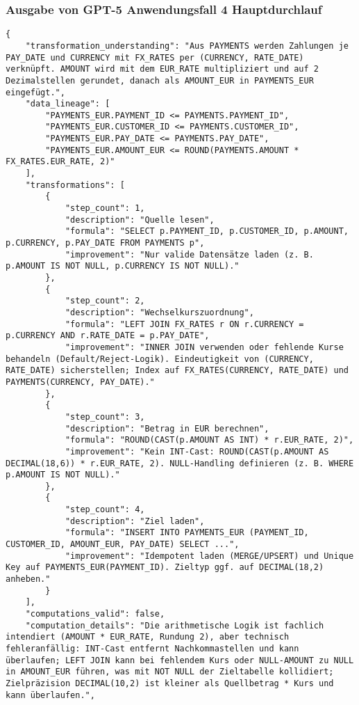 \subsubsection{Ausgabe von GPT-5 Anwendungsfall 4 Hauptdurchlauf}\label{anhang:subsubsec:gpt_case4_prompt1}
\begin{lstlisting}[caption={Ausgabe: GPT-5 Anwendungsfall 4 Hauptdurchlauf},label={gpt_case4_prompt1}]
{
    "transformation_understanding": "Aus PAYMENTS werden Zahlungen je PAY_DATE und CURRENCY mit FX_RATES per (CURRENCY, RATE_DATE) verknüpft. AMOUNT wird mit dem EUR_RATE multipliziert und auf 2 Dezimalstellen gerundet, danach als AMOUNT_EUR in PAYMENTS_EUR eingefügt.",
    "data_lineage": [
        "PAYMENTS_EUR.PAYMENT_ID <= PAYMENTS.PAYMENT_ID",
        "PAYMENTS_EUR.CUSTOMER_ID <= PAYMENTS.CUSTOMER_ID",
        "PAYMENTS_EUR.PAY_DATE <= PAYMENTS.PAY_DATE",
        "PAYMENTS_EUR.AMOUNT_EUR <= ROUND(PAYMENTS.AMOUNT * FX_RATES.EUR_RATE, 2)"
    ],
    "transformations": [
        {
            "step_count": 1,
            "description": "Quelle lesen",
            "formula": "SELECT p.PAYMENT_ID, p.CUSTOMER_ID, p.AMOUNT, p.CURRENCY, p.PAY_DATE FROM PAYMENTS p",
            "improvement": "Nur valide Datensätze laden (z. B. p.AMOUNT IS NOT NULL, p.CURRENCY IS NOT NULL)."
        },
        {
            "step_count": 2,
            "description": "Wechselkurszuordnung",
            "formula": "LEFT JOIN FX_RATES r ON r.CURRENCY = p.CURRENCY AND r.RATE_DATE = p.PAY_DATE",
            "improvement": "INNER JOIN verwenden oder fehlende Kurse behandeln (Default/Reject-Logik). Eindeutigkeit von (CURRENCY, RATE_DATE) sicherstellen; Index auf FX_RATES(CURRENCY, RATE_DATE) und PAYMENTS(CURRENCY, PAY_DATE)."
        },
        {
            "step_count": 3,
            "description": "Betrag in EUR berechnen",
            "formula": "ROUND(CAST(p.AMOUNT AS INT) * r.EUR_RATE, 2)",
            "improvement": "Kein INT-Cast: ROUND(CAST(p.AMOUNT AS DECIMAL(18,6)) * r.EUR_RATE, 2). NULL-Handling definieren (z. B. WHERE p.AMOUNT IS NOT NULL)."
        },
        {
            "step_count": 4,
            "description": "Ziel laden",
            "formula": "INSERT INTO PAYMENTS_EUR (PAYMENT_ID, CUSTOMER_ID, AMOUNT_EUR, PAY_DATE) SELECT ...",
            "improvement": "Idempotent laden (MERGE/UPSERT) und Unique Key auf PAYMENTS_EUR(PAYMENT_ID). Zieltyp ggf. auf DECIMAL(18,2) anheben."
        }
    ],
    "computations_valid": false,
    "computation_details": "Die arithmetische Logik ist fachlich intendiert (AMOUNT * EUR_RATE, Rundung 2), aber technisch fehleranfällig: INT-Cast entfernt Nachkommastellen und kann überlaufen; LEFT JOIN kann bei fehlendem Kurs oder NULL-AMOUNT zu NULL in AMOUNT_EUR führen, was mit NOT NULL der Zieltabelle kollidiert; Zielpräzision DECIMAL(10,2) ist kleiner als Quellbetrag * Kurs und kann überlaufen.",

\end{lstlisting}
